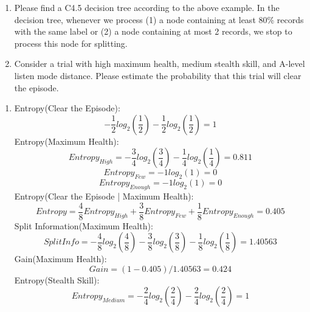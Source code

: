 \documentclass{article}
\begin{document}
\begin{enumerate}[label=(\roman*)]
    \item Please find a C4.5 decision tree according to the above example. In the decision tree, whenever we process (1) a node containing at least 80\% records with the same label or (2) a node containing at most 2 records, we stop to process this node for splitting.
    \item Consider a trial with high maximum health, medium stealth skill, and A-level listen mode distance. Please estimate the probability that this trial will clear the episode.
\end{enumerate}

\begin{enumerate}[label=(\roman*)]
    \item 
    Entropy(Clear the Episode):
    \begin{equation}
        -\frac{1}{2}log_2(\frac{1}{2}) - \frac{1}{2}log_2(\frac{1}{2}) = 1
    \end{equation}
    Entropy(Maximum Health):
    \begin{equation}
        Entropy_{High} = -\frac{3}{4}log_2(\frac{3}{4}) - \frac{1}{4}log_2(\frac{1}{4}) = 0.811
    \end{equation}
    \begin{equation}
        Entropy_{Few} = -1log_2(1) = 0
    \end{equation}
    \begin{equation}
        Entropy_{Enough} = -1log_2(1) = 0
    \end{equation}
    Entropy(Clear the Episode | Maximum Health):
    \begin{equation}
        Entropy = \frac{4}{8}Entropy_{High} + \frac{3}{8}Entropy_{Few} + \frac{1}{8}Entropy_{Enough} = 0.405
    \end{equation}
    Split Information(Maximum Health):
    \begin{equation}
        SplitInfo = -\frac{4}{8}log_2(\frac{4}{8}) - \frac{3}{8}log_2(\frac{3}{8}) - \frac{1}{8}log_2(\frac{1}{8}) = 1.40563
    \end{equation}
    Gain(Maximum Health):
    \begin{equation}
        Gain = (1 - 0.405) / 1.40563 = 0.424
    \end{equation}
    Entropy(Stealth Skill):
    \begin{equation}
        Entropy_{Medium} = -\frac{2}{4}log_2(\frac{2}{4}) - \frac{2}{4}log_2(\frac{2}{4}) = 1
    \end{equation}

\end{enumerate}
\end{document}
